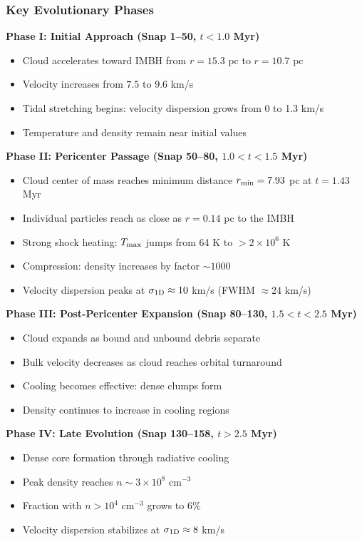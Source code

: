 \documentclass[twocolumn,amsmath,amssymb,prd,superscriptaddress,nofootinbib]{revtex4-2}
\begin{document}
\subsubsection{Key Evolutionary Phases}

\textbf{Phase I: Initial Approach (Snap 1--50, $t < 1.0$ Myr)}
\begin{itemize}
    \item Cloud accelerates toward IMBH from $r = 15.3$ pc to $r = 10.7$ pc
    \item Velocity increases from $7.5$ to $9.6$ km/s
    \item Tidal stretching begins: velocity dispersion grows from 0 to 1.3 km/s
    \item Temperature and density remain near initial values
\end{itemize}

\textbf{Phase II: Pericenter Passage (Snap 50--80, $1.0 < t < 1.5$ Myr)}
\begin{itemize}
    \item Cloud center of mass reaches minimum distance $r_{\rm min} = 7.93$ pc at $t = 1.43$ Myr
    \item Individual particles reach as close as $r = 0.14$ pc to the IMBH
    \item Strong shock heating: $T_{\rm max}$ jumps from 64 K to $>2\times 10^6$ K
    \item Compression: density increases by factor $\sim 1000$
    \item Velocity dispersion peaks at $\sigma_{\rm 1D} \approx 10$ km/s (FWHM $\approx 24$ km/s)
\end{itemize}

\textbf{Phase III: Post-Pericenter Expansion (Snap 80--130, $1.5 < t < 2.5$ Myr)}
\begin{itemize}
    \item Cloud expands as bound and unbound debris separate
    \item Bulk velocity decreases as cloud reaches orbital turnaround
    \item Cooling becomes effective: dense clumps form
    \item Density continues to increase in cooling regions
\end{itemize}

\textbf{Phase IV: Late Evolution (Snap 130--158, $t > 2.5$ Myr)}
\begin{itemize}
    \item Dense core formation through radiative cooling
    \item Peak density reaches $n \sim 3\times 10^8$ cm$^{-3}$
    \item Fraction with $n > 10^4$ cm$^{-3}$ grows to 6\%
    \item Velocity dispersion stabilizes at $\sigma_{\rm 1D} \approx 8$ km/s
\end{itemize}
\end{document}
